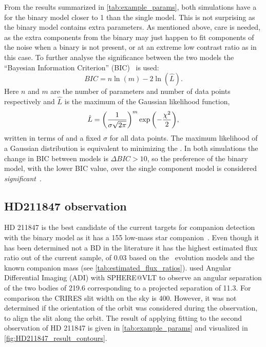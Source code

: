 From the results summarized in \cref{tab:example_params}, both simulations have a \textchisquaredreduced{} for the binary model closer to 1 than the single model.
This is not surprising as the binary model contains extra parameters.
As mentioned above, care is needed, as the extra components from the binary may just happen to fit components of the noise when a binary is not present, or at an extreme low contrast ratio as in this case.
To further analyse the significance between the two models the ``Bayesian Information Criterion'' ({BIC})~\citep{schwarz_estimating_1978} is used:
\begin{equation}
{BIC} = n\ln{(m)} - 2\ln{(\hat{L})}.
\end{equation}
Here \(n\) and \(m\) are the number of parameters and number of data points respectively and \(\hat{L}\) is the maximum of the Gaussian likelihood function, 
\begin{equation}
\hat{L} = {\left(\frac{1}{\sigma \sqrt{2\pi}}\right)}^{m} \exp{\left(-\frac{{\chi}^{2}}{2}\right)},
\end{equation}
written in terms of \textchisquared{} and a fixed \(\sigma\) for all data points.
The maximum likelihood of a Gaussian distribution is equivalent to minimizing the \textchisquared{}.
In both simulations the change in {BIC} between models is \(\Delta {BIC} >10\), so the preference of the binary model, with the lower {BIC} value, over the single component model is considered \emph{significant}~\citep{kass_bayes_1995}.

\subsection{HD211847 observation}
\label{subsec:results-hd211847}
{HD 211847} is the best candidate of the current targets for companion detection with the \textchisquared{} binary model as it has a 155\Mjup{} low-mass star companion~\citet{moutou_eccentricity_2017}.
Even though it has been determined not a {BD} in the literature it has the highest estimated flux ratio out of the current sample, of 0.03 based on the~\citet{baraffe_new_2015} evolution models and the known companion mass (see \cref{tab:estimated_flux_ratios}).
\citet{moutou_eccentricity_2017} used Angular Differential Imaging ({ADI}) with {SPHERE@VLT} to observe an angular separation of the two bodies of 219.6\mas{} corresponding to a projected separation of 11.3\AU{}. For comparison the {CRIRES} slit width on the sky is 400\mas.
However, it was not determined if the orientation of the orbit was considered during the observation, to align the slit along the orbit.
The result of applying \textchisquared{} fitting to the second observation of {HD 211847} is given in \cref{tab:example_params} and visualized in \cref{fig:HD211847_result_contours}.

